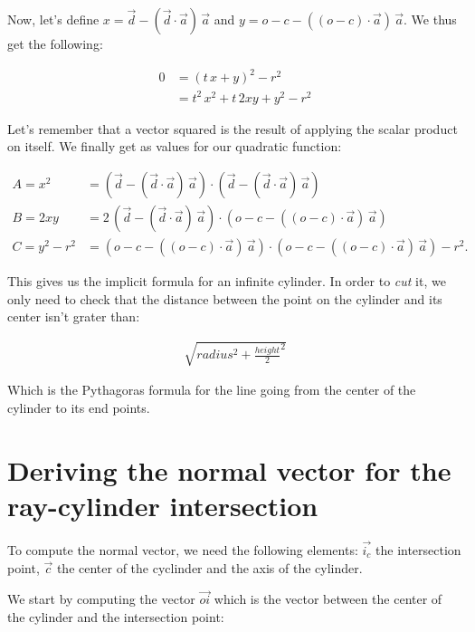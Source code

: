 \documentclass{article}
\begin{document}
    Now, let's define $x = \vec{d} - (\vec{d} \cdot \vec{a}) \, \vec{a}$ and $y = o - c - ((o - c) \cdot \vec{a}) \, \vec{a}$.
    We thus get the following:
    
    \begin{align*}
        0 &= \left(t \, x + y\right)^2 - r^2\\
        &= t^2 \, x^2 + t \, 2xy + y^2 - r^2
    \end{align*}
    
    Let's remember that a vector squared is the result of applying the scalar product on itself.
    We finally get as values for our quadratic function:
    
    \begin{align*}
        A = x^2 &= \left(\vec{d} - (\vec{d} \cdot \vec{a}) \, \vec{a}\right) \cdot \left(\vec{d} - (\vec{d} \cdot \vec{a}) \, \vec{a}\right)\\
        B = 2xy &= 2 \, \left(\vec{d} - (\vec{d} \cdot \vec{a}) \, \vec{a}\right) \cdot \left(o - c - ((o - c) \cdot \vec{a}) \, \vec{a}\right)\\
        C = y^2 - r^2 &= \left(o - c - ((o - c) \cdot \vec{a}) \, \vec{a}\right) \cdot \left(o - c - ((o - c) \cdot \vec{a}) \, \vec{a}\right) - r^2.
    \end{align*}

    This gives us the implicit formula for an infinite cylinder. In order to \textit{cut} it, we only need to check that the distance between the point on the cylinder and its center isn't grater than:

    \begin{align*}
        \sqrt{radius^2+\frac{height}{2}^2}
    \end{align*}

    Which is the Pythagoras formula for the line going from the center of the cylinder to its end points.

    \section{Deriving the normal vector for the ray-cylinder intersection}

    To compute the normal vector, we need the following elements: $\vec{i_c}$ the intersection point, $\vec{c}$ the center of the cyclinder and the axis of the cylinder.

    We start by computing the vector $\vec{oi}$ which is the vector between the center of the cylinder and the intersection point:
\end{document}
